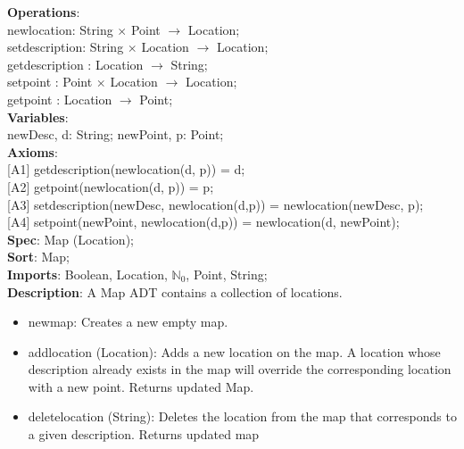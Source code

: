 \documentclass[12pt]{article}
\begin{document}
\begin{spacing}{1.5}
\noindent \textbf{Operations}:\\
\hspace*{5mm} newlocation: String $\times$ Point $\rightarrow$ Location;\\
\hspace*{5mm} setdescription: String $\times$ Location $\rightarrow$ Location;\\
\hspace*{5mm} getdescription : Location $\rightarrow$ String;\\
\hspace*{5mm} setpoint : Point $\times$ Location $\rightarrow$ Location;\\
\hspace*{5mm} getpoint : Location $\rightarrow$ Point;\\
\noindent \textbf{Variables}:\\
\hspace*{5mm} newDesc, d: String; newPoint, p: Point;\\
\noindent \textbf{Axioms}:\\
\hspace*{5mm} [A1] getdescription(newlocation(d, p)) = d;\\
\hspace*{5mm} [A2] getpoint(newlocation(d, p)) = p;\\
\hspace*{5mm} [A3] setdescription(newDesc, newlocation(d,p)) = newlocation(newDesc, p);\\
\hspace*{5mm} [A4] setpoint(newPoint, newlocation(d,p)) = newlocation(d, newPoint);\\
\newpage
\noindent \textbf{Spec}: Map (Location);\\
\noindent \textbf{Sort}: Map;\\
\noindent \textbf{Imports}: Boolean, Location, $\mathbb{N}_0$, Point, String;\\
\noindent \textbf{Description}: A Map ADT contains a collection of locations.
\begin{itemize}
	\item newmap: Creates a new empty map.
	\item addlocation (Location): Adds a new location on the map. A location whose description already exists in the map will override the corresponding location with a new
	point.
Returns updated Map.
	\item deletelocation (String): Deletes the location from the map that corresponds to
	a given description. Returns updated map


\end{itemize}
\end{spacing}
\end{document}
